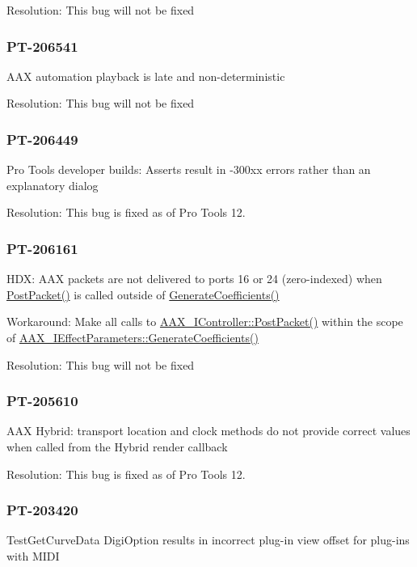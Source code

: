 Resolution\+: This bug will not be fixed\hypertarget{a00374_PT-206541}{}\subsubsection{P\+T-\/206541}\label{a00374_PT-206541}
A\+A\+X automation playback is late and non-\/deterministic

Resolution\+: This bug will not be fixed\hypertarget{a00374_PT-206449}{}\subsubsection{P\+T-\/206449}\label{a00374_PT-206449}
Pro Tools developer builds\+: Asserts result in -\/300xx errors rather than an explanatory dialog

Resolution\+: This bug is fixed as of Pro Tools 12.\hypertarget{a00374_PT-206161}{}\subsubsection{P\+T-\/206161}\label{a00374_PT-206161}
H\+D\+X\+: A\+A\+X packets are not delivered to ports 16 or 24 (zero-\/indexed) when \hyperlink{a00090_ae5dd2b5925dbc181513bca1c4ac5e716}{Post\+Packet()} is called outside of \hyperlink{a00061_a083265b008921b6114ede387711694b7}{Generate\+Coefficients()}

Workaround\+: Make all calls to \hyperlink{a00090_ae5dd2b5925dbc181513bca1c4ac5e716}{A\+A\+X\+\_\+\+I\+Controller\+::\+Post\+Packet()} within the scope of \hyperlink{a00061_a083265b008921b6114ede387711694b7}{A\+A\+X\+\_\+\+I\+Effect\+Parameters\+::\+Generate\+Coefficients()}

Resolution\+: This bug will not be fixed\hypertarget{a00374_PT-205610}{}\subsubsection{P\+T-\/205610}\label{a00374_PT-205610}
A\+A\+X Hybrid\+: transport location and clock methods do not provide correct values when called from the Hybrid render callback

Resolution\+: This bug is fixed as of Pro Tools 12.\hypertarget{a00374_PT-203420}{}\subsubsection{P\+T-\/203420}\label{a00374_PT-203420}
{\ttfamily Test\+Get\+Curve\+Data} Digi\+Option results in incorrect plug-\/in view offset for plug-\/ins with M\+I\+D\+I

